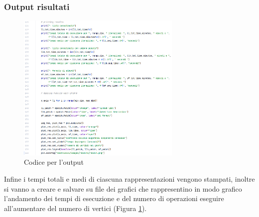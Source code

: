 \documentclass[12pt]{article}
\begin{document}
\subsubsection{Output risultati}
\begin{figure}[h]
    \centering
    \includegraphics[width=0.7\textwidth]{images/main_code_images/main_output.png}
    \caption{Codice per l'output}
    \label{fig:main_output}
\end{figure}
Infine i tempi totali e medi di ciascuna rappresentazioni vengono stampati, inoltre si vanno a creare e salvare su file dei grafici che rappresentino in modo grafico l'andamento dei tempi di esecuzione e del numero di operazioni eseguire all'aumentare del numero di vertici (Figura \ref{fig:main_output}).

\end{document}
